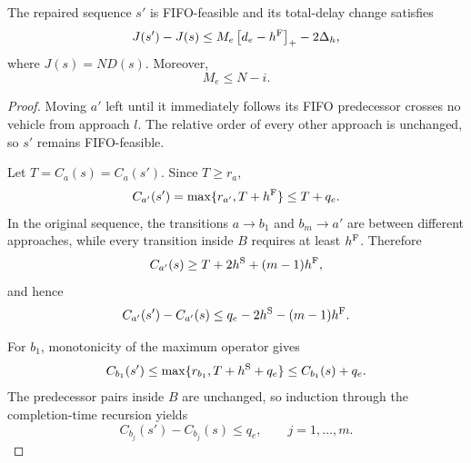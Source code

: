 \begin{lemma}
\label{lem:indexed-local-repair}
The repaired sequence \(s'\) is FIFO-feasible and its total-delay change
satisfies
\begin{equation}
J(s')-J(s)
\le
M_e\left[d_e-h^{\mathrm{F}}\right]_{+}-2\Delta_h,
\label{eq:indexed-local-bound}
\end{equation}
where \(J(s)=ND(s)\). Moreover,
\begin{equation}
M_e\le N-i.
\label{eq:indexed-affected-count}
\end{equation}
\end{lemma}

\begin{proof}
Moving \(a'\) left until it immediately follows its FIFO predecessor crosses
no vehicle from approach \(l\). The relative order of every other approach is
unchanged, so \(s'\) remains FIFO-feasible.

Let \(T=C_a(s)=C_a(s')\). Since \(T\ge r_a\),
\begin{equation}
C_{a'}(s')
=\max\{r_{a'},T+h^{\mathrm{F}}\}
\le T+q_e.
\end{equation}
In the original sequence, the transitions \(a\to b_1\) and
\(b_m\to a'\) are between different approaches, while every transition
inside \(B\) requires at least \(h^{\mathrm{F}}\). Therefore
\begin{equation}
C_{a'}(s)
\ge T+2h^{\mathrm{S}}+(m-1)h^{\mathrm{F}},
\end{equation}
and hence
\begin{equation}
C_{a'}(s')-C_{a'}(s)
\le q_e-2h^{\mathrm{S}}-(m-1)h^{\mathrm{F}}.
\label{eq:moved-vehicle-change}
\end{equation}

For \(b_1\), monotonicity of the maximum operator gives
\begin{equation}
C_{b_1}(s')
\le \max\{r_{b_1},T+h^{\mathrm{S}}+q_e\}
\le C_{b_1}(s)+q_e.
\end{equation}
The predecessor pairs inside \(B\) are unchanged, so induction through the
completion-time recursion yields
\begin{equation}
C_{b_j}(s')-C_{b_j}(s)\le q_e,
\qquad j=1,\ldots,m.
\label{eq:block-vehicle-change}
\end{equation}


\end{proof}
